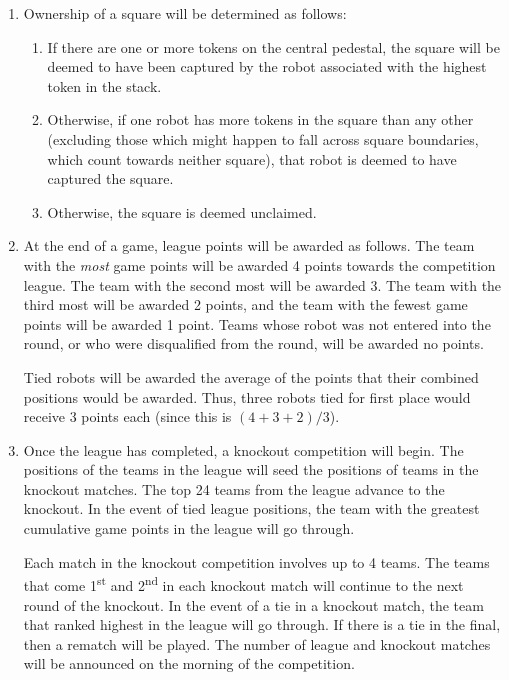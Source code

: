 \begin{enumerate}
\item Ownership of a square will be determined as follows:
\begin{enumerate}
  \item If there are one or more tokens on the central pedestal, the square will be deemed to have been captured by the robot associated with the highest token in the stack.
  \item Otherwise, if one robot has more tokens in the square than any other (excluding those which might happen to fall across square boundaries, which count towards neither square), that robot is deemed to have captured the square.
  \item Otherwise, the square is deemed unclaimed.
\end{enumerate}

\item At the end of a game, league points will be awarded as follows.
      The team with the \emph{most} game points will be awarded 4 points towards the competition league.
      The team with the second most will be awarded 3.
      The team with the third most will be awarded 2 points, and the team with the fewest game points will be awarded 1 point.
      Teams whose robot was not entered into the round, or who were disqualified from the round, will be awarded no points.

      Tied robots will be awarded the average of the points that their combined positions would be awarded.
      Thus, three robots tied for first place would receive 3 points each (since this is $(4+3+2)/3$).

\item Once the league has completed, a knockout competition will begin.
      The positions of the teams in the league will seed the positions of teams in the knockout matches.
      The top 24 teams from the league advance to the knockout.
      In the event of tied league positions, the team with the greatest cumulative game points in the league will go through.

      Each match in the knockout competition involves up to 4 teams.
      The teams that come 1\textsuperscript{st} and 2\textsuperscript{nd} in each knockout match will continue to the next round of the knockout.
      In the event of a tie in a knockout match, the team that ranked highest in the league will go through.
      If there is a tie in the final, then a rematch will be played.
      The number of league and knockout matches will be announced on the morning of the competition.


\end{enumerate}

